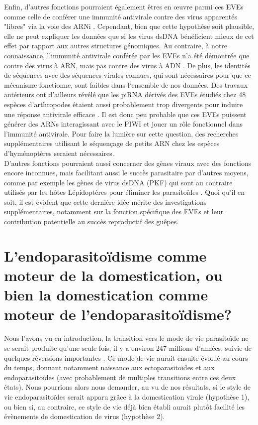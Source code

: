 Enfin, d'autres fonctions pourraient également êtres en œuvre parmi ces EVEs comme celle de conférer une immunité antivirale contre des virus apparentés "libres" via la voie des ARNi \citep{suzuki_non-retroviral_2020,whitfield_diversity_2017}. Cependant, bien que cette hypothèse soit plausible, elle ne peut expliquer les données que si les virus dsDNA bénéficient mieux de cet effet par rapport aux autres structures génomiques. Au contraire, à notre connaissance, l'immunité antivirale conférée par les EVEs n'a été démontrée que contre des virus à ARN, mais pas contre des virus à ADN \citep{ter_horst_endogenous_2019}. De plus, les identités de séquences avec des séquences virales connues, qui sont nécessaires pour que ce mécanisme fonctionne, sont faibles dans l'ensemble de nos données. Des travaux antérieurs ont d'ailleurs révélé que les piRNA dérivés des EVEs étudiés chez 48 espèces d'arthropodes étaient aussi probablement trop divergents pour induire une réponse antivirale efficace \citep{ter_horst_endogenous_2019}. Il est donc peu probable que ces EVEs puissent générer des ARNs interagissant avec le PIWI et jouer un rôle fonctionnel dans l'immunité antivirale. Pour faire la lumière sur cette question, des recherches supplémentaires utilisant le séquençage de petits ARN chez les espèces d'hyménoptères seraient nécessaires. \\

D'autres fonctions pourraient aussi concerner des gènes viraux avec des fonctions encore inconnues, mais facilitant aussi le succès parasitaire par d'autres moyens, comme par exemple les gènes de virus dsDNA (PKF) qui sont au contraire utilisés par les hôtes Lépidoptères pour éliminer les parasitoïdes \citep{gasmi_horizontally_2021}. Quoi qu'il en soit, il est évident que cette dernière idée mérite des investigations supplémentaires, notamment sur la fonction spécifique des EVEs et leur contribution potentielle au succès reproductif des guêpes.\\

\section{L'endoparasitoïdisme comme moteur de la domestication, ou bien la domestication comme moteur de l'endoparasitoïdisme?}

Nous l'avons vu en introduction, la transition vers le mode de vie parasitoïde ne se serait produite qu'une seule fois, il y a environ 247 millions d'années, suivie de quelques réversions importantes \citep{peters_evolutionary_2017}. Ce mode de vie aurait ensuite évolué au cours du temps, donnant notamment naissance aux ectoparasitoïdes et aux endoparasitoïdes (avec probablement de multiples transitions entre ces deux états). Nous pourrions alors nous demander, au vu de nos résultats, si le style de vie endoparasitoïdes serait apparu grâce à la domestication virale (hypothèse 1), ou bien si, au contraire, ce style de vie déjà bien établi aurait plutôt facilité les évènements de domestication de virus (hypothèse 2). 


